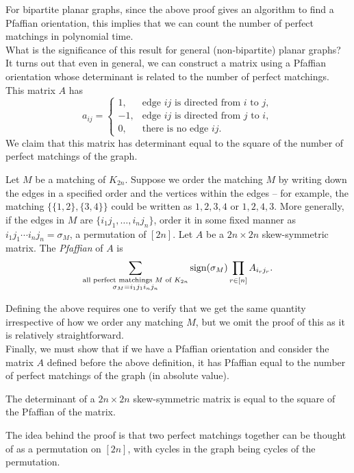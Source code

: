 For bipartite planar graphs, since the above proof gives an algorithm to find a Pfaffian orientation, this implies that we can count the number of perfect matchings in polynomial time.\\
What is the significance of this result for general (non-bipartite) planar graphs? It turns out that even in general, we can construct a matrix using a Pfaffian orientation whose determinant is related to the number of perfect matchings. This matrix $A$ has
\[ a_{ij} = \begin{cases} 1, & \text{edge $ij$ is directed from $i$ to $j$,} \\ -1, & \text{edge $ij$ is directed from $j$ to $i$}, \\ 0, & \text{there is no edge $ij$.} \end{cases} \]
We claim that this matrix has determinant equal to the square of the number of perfect matchings of the graph.

\begin{fdef}[Pfaffian]
	Let $M$ be a matching of $K_{2n}$. Suppose we order the matching $M$ by writing down the edges in a specified order and the vertices within the edges -- for example, the matching $\{\{1,2\},\{3,4\}\}$ could be written as $1,2,3,4$ or $1,2,4,3$. More generally, if the edges in $M$ are $\{i_1j_1,\ldots,i_nj_n\}$, order it in some fixed manner as $i_1j_1 \cdots i_nj_n = \sigma_M$, a permutation of $[2n]$. Let $A$ be a $2n \times 2n$ skew-symmetric matrix. The \emph{Pfaffian} of $A$ is
	\[ \sum_{\substack{\text{all perfect matchings $M$ of $K_{2n}$} \\ \sigma_M = i_1j_1i_nj_n}} \operatorname{sign}(\sigma_M) \prod_{r \in [n]} A_{i_r j_r}.  \]
\end{fdef}
Defining the above requires one to verify that we get the same quantity irrespective of how we order any matching $M$, but we omit the proof of this as it is relatively straightforward.\\
Finally, we must show that if we have a Pfaffian orientation and consider the matrix $A$ defined before the above definition, it has Pfaffian equal to the number of perfect matchings of the graph (in absolute value).

\begin{fprop}
	The determinant of a $2n \times 2n$ skew-symmetric matrix is equal to the square of the Pfaffian of the matrix.
\end{fprop}
The idea behind the proof is that two perfect matchings together can be thought of as a permutation on $[2n]$, with cycles in the graph being cycles of the permutation.

